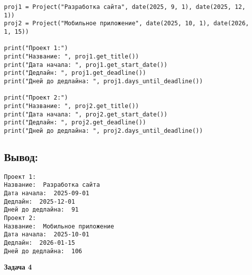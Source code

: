 \begin{enumerate}
\begin{lstlisting}[caption=Пример кода]
proj1 = Project("Разработка сайта", date(2025, 9, 1), date(2025, 12, 1))
proj2 = Project("Мобильное приложение", date(2025, 10, 1), date(2026, 1, 15))

print("Проект 1:")
print("Название: ", proj1.get_title())
print("Дата начала: ", proj1.get_start_date())
print("Дедлайн: ", proj1.get_deadline())
print("Дней до дедлайна: ", proj1.days_until_deadline())

print("Проект 2:")
print("Название: ", proj2.get_title())
print("Дата начала: ", proj2.get_start_date())
print("Дедлайн: ", proj2.get_deadline())
print("Дней до дедлайна: ", proj2.days_until_deadline())
\end{lstlisting}

\subsection*{Вывод:}
\begin{lstlisting}[caption=Ожидаемый вывод]
Проект 1:
Название:  Разработка сайта
Дата начала:  2025-09-01
Дедлайн:  2025-12-01
Дней до дедлайна:  91
Проект 2:
Название:  Мобильное приложение
Дата начала:  2025-10-01
Дедлайн:  2026-01-15
Дней до дедлайна:  106
\end{lstlisting}


\end{enumerate}


\textbf{Задача 4}

